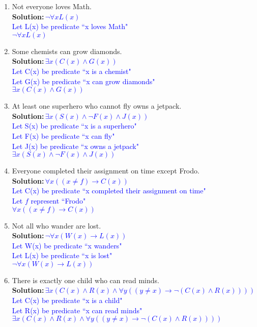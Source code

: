 \documentclass{article}
\renewcommand{\implies}{\rightarrow}
\newcommand{\sol}[1]{\textbf{Solution:\,}\textcolor{blue}{#1}}
\begin{document}
\begin{enumerate}
\begin{enumerate}
\item Not everyone loves Math.
\\\sol{$ \neg\forall x L(x)$
\\Let L(x) be predicate ``x loves Math"
\\$ \neg\forall x L(x)$
}
\item Some chemists can grow diamonds. 
\\\sol{$\exists x (C(x)\land G(x))$
\\Let C(x) be predicate ``x is a chemist"
\\Let G(x) be predicate ``x can grow diamonds"
\\$\exists x (C(x)\land G(x))$
}
\item At least one superhero who cannot fly owns a jetpack.
\\\sol{$\exists x (S(x)\land \neg F(x) \land J(x))$
\\Let S(x) be predicate ``x is a superhero"
\\Let F(x) be predicate ``x can fly"
\\Let J(x) be predicate ``x owns a jetpack"
\\$\exists x (S(x)\land \neg F(x) \land J(x))$
}
\item Everyone completed their assignment on time except Frodo.
\\\sol{$\forall x ((x\neq f)\implies C(x))$
\\Let C(x) be predicate ``x completed their assignment on time"
\\Let $f$ represent ``Frodo"
\\$\forall x ((x\neq f)\implies C(x))$
}
\item Not all who wander are lost. 
\\\sol{$\neg\forall x(W(x)\implies L(x))$
\\Let W(x) be predicate ``x wanders"
\\Let L(x) be predicate ``x is lost"
\\$\neg\forall x(W(x)\implies L(x))$
}
\item There is exactly one child who can read minds.
\\\sol{$\exists x (C(x)\land R(x) \land \forall y((y\neq x)\implies \neg (C(x)\land R(x))))$
\\Let C(x) be predicate ``x is a child"
\\Let R(x) be predicate ``x can read minds"
\\$\exists x (C(x)\land R(x) \land \forall y((y\neq x)\implies \neg (C(x)\land R(x))))$
}
\end{enumerate}


\end{enumerate}
\end{document}

